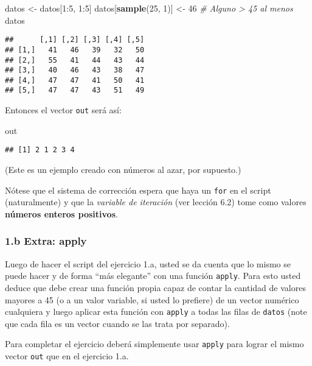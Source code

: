 \documentclass[]{article}
\newenvironment{Shaded}{}{}
\newcommand{\KeywordTok}[1]{\textcolor[rgb]{0.00,0.44,0.13}{\textbf{{#1}}}}
\newcommand{\DecValTok}[1]{\textcolor[rgb]{0.25,0.63,0.44}{{#1}}}
\newcommand{\CommentTok}[1]{\textcolor[rgb]{0.38,0.63,0.69}{\textit{{#1}}}}
\newcommand{\NormalTok}[1]{{#1}}
\begin{document}
\begin{Shaded}
\begin{Highlighting}[]
\NormalTok{datos <- datos[}\DecValTok{1}\NormalTok{:}\DecValTok{5}\NormalTok{, }\DecValTok{1}\NormalTok{:}\DecValTok{5}\NormalTok{]}
\NormalTok{datos[}\KeywordTok{sample}\NormalTok{(}\DecValTok{25}\NormalTok{, }\DecValTok{1}\NormalTok{)] <- }\DecValTok{46}  \CommentTok{# Alguno > 45 al menos}
\NormalTok{datos}
\end{Highlighting}
\end{Shaded}
\begin{verbatim}
##      [,1] [,2] [,3] [,4] [,5]
## [1,]   41   46   39   32   50
## [2,]   55   41   44   43   44
## [3,]   40   46   43   38   47
## [4,]   47   47   41   50   41
## [5,]   47   47   43   51   49
\end{verbatim}
Entonces el vector \texttt{out} será así:

\begin{Shaded}
\begin{Highlighting}[]
\NormalTok{out}
\end{Highlighting}
\end{Shaded}
\begin{verbatim}
## [1] 2 1 2 3 4
\end{verbatim}
(Este es un ejemplo creado con números al azar, por supuesto.)

Nótese que el sistema de corrección espera que haya un \texttt{for} en
el script (naturalmente) y que la \emph{variable de iteración} (ver
lección 6.2) tome como valores \textbf{números enteros positivos}.

\subsubsection{1.b Extra: apply}

Luego de hacer el script del ejercicio 1.a, usted se da cuenta que lo
mismo se puede hacer y de forma ``más elegante'' con una función
\texttt{apply}. Para esto usted deduce que debe crear una función propia
capaz de contar la cantidad de valores mayores a 45 (o a un valor
variable, si usted lo prefiere) de un vector numérico cualquiera y luego
aplicar esta función con \texttt{apply} a todas las filas de
\texttt{datos} (note que cada fila es un vector cuando se las trata por
separado).

Para completar el ejercicio deberá simplemente usar \texttt{apply} para
lograr el mismo vector \texttt{out} que en el ejercicio 1.a.
\end{document}
